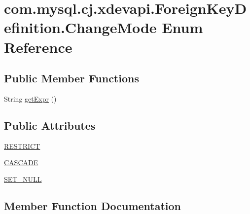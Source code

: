 \hypertarget{enumcom_1_1mysql_1_1cj_1_1xdevapi_1_1_foreign_key_definition_1_1_change_mode}{}\section{com.\+mysql.\+cj.\+xdevapi.\+Foreign\+Key\+Definition.\+Change\+Mode Enum Reference}
\label{enumcom_1_1mysql_1_1cj_1_1xdevapi_1_1_foreign_key_definition_1_1_change_mode}
\subsection*{Public Member Functions}
\begin{DoxyCompactItemize}
\item 
String \mbox{\hyperlink{enumcom_1_1mysql_1_1cj_1_1xdevapi_1_1_foreign_key_definition_1_1_change_mode_aad5b7590ed25eab2bcd98ad32f479ceb}{get\+Expr}} ()
\end{DoxyCompactItemize}
\subsection*{Public Attributes}
\begin{DoxyCompactItemize}
\item 
\mbox{\hyperlink{enumcom_1_1mysql_1_1cj_1_1xdevapi_1_1_foreign_key_definition_1_1_change_mode_a652113557f37d85e0f6ad8c4c83bf864}{R\+E\+S\+T\+R\+I\+CT}}
\item 
\mbox{\hyperlink{enumcom_1_1mysql_1_1cj_1_1xdevapi_1_1_foreign_key_definition_1_1_change_mode_ada7c6b07006f752748719b8276a3c88c}{C\+A\+S\+C\+A\+DE}}
\item 
\mbox{\hyperlink{enumcom_1_1mysql_1_1cj_1_1xdevapi_1_1_foreign_key_definition_1_1_change_mode_a29451c017ce42e821426b05406d3eed3}{S\+E\+T\+\_\+\+N\+U\+LL}}
\end{DoxyCompactItemize}


\subsection{Member Function Documentation}
\mbox{\label{enumcom_1_1mysql_1_1cj_1_1xdevapi_1_1_foreign_key_definition_1_1_change_mode_aad5b7590ed25eab2bcd98ad32f479ceb}} 
